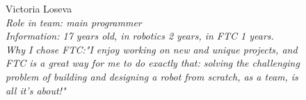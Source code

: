 \begin{figure}[H]	
	\begin{minipage}{0.47\linewidth}
		Victoria Loseva\\
		\emph{Role in team: main programmer\\ }
		\emph{Information: 17 years old, in robotics 2 years, in FTC 1 years. \\} 
		\emph{Why I chose FTC:"I enjoy working on new and unique projects, and FTC is a great way for me to do exactly that: solving the challenging problem of building and designing a robot from scratch, as a team, is all it's about!"}			
	\end{minipage}	
	\hfill
	\begin{minipage}{0.47\linewidth}
	\end{minipage}
\end{figure}

\fillpage


